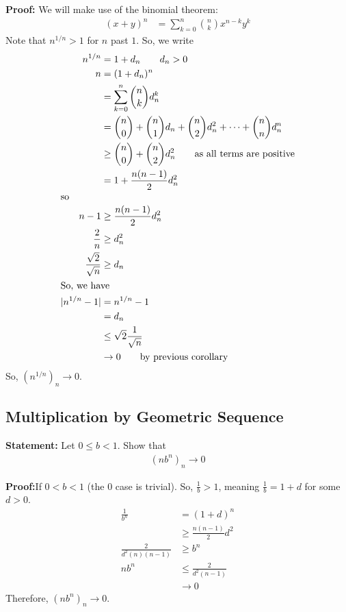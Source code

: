 \documentclass[10pt]{extarticle}
\begin{document}
      \textbf{Proof:} We will make use of the binomial theorem:
      \begin{align*}
        (x+y)^n &= \sum_{k=0}^{n} {n\choose k}x^{n-k}y^{k}
      \end{align*}
      Note that $n^{1/n} > 1$ for $n$ past $1$. So, we write
      \begin{align*}
        n^{1/n} &= 1 + d_n \tag*{$d_n > 0$}\\
        n &= (1+d_n)^{n}\\
          &= \sum_{k=0}^{n} {n\choose k}d_n^{k}\\
          &= {n\choose 0} + {n\choose 1}d_n + {n\choose 2}d_n^2 + \cdots + {n\choose n}d_n^n\\
          &\geq {n\choose 0} + {n\choose 2}d_n^2 \tag*{as all terms are positive}\\
          &= 1 + \frac{n(n-1)}{2}d_n^2\\
          \shortintertext{so}
        n-1 &\geq \frac{n(n-1)}{2}d_n^2\\
        \frac{2}{n} &\geq d_n^2\\
        \frac{\sqrt{2}}{\sqrt{n}} &\geq d_n\\
        \shortintertext{So, we have}
        |n^{1/n} - 1| &= n^{1/n} - 1\\
                      &= d_n\\
                      &\leq \sqrt{2} \frac{1}{\sqrt{n}}\\
                      &\rightarrow 0 \tag*{by previous corollary}
      \end{align*}
      So, $\left(n^{1/n}\right)_n \rightarrow 0$.
    \subsection{Multiplication by Geometric Sequence}%
    \textbf{Statement:} Let $0 \leq b < 1$. Show that
      \begin{align*}
        \left(nb^n\right)_n \rightarrow 0
      \end{align*}

      \textbf{Proof:}If $0 < b < 1$ (the $0$ case is trivial). So, $\frac{1}{b} > 1$, meaning $\frac{1}{b} = 1 + d$ for some $d > 0$.
      \begin{align*}
        \frac{1}{b^n} &= (1 + d)^n\\
                      &\geq \frac{n(n-1)}{2}d^2\\
        \frac{2}{d^2(n)(n-1)} &\geq b^n\\
        nb^n &\leq \frac{2}{d^2(n-1)}\\
             &\rightarrow 0 \tag*{by previous corollary}
      \end{align*}
      Therefore, $(nb^n)_n \rightarrow 0$.
\end{document}
